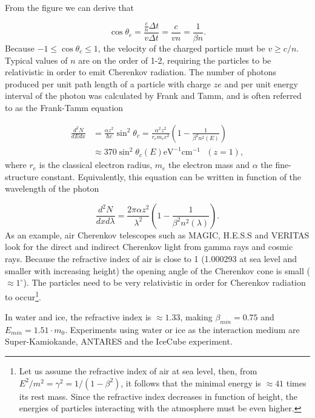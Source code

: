 From the figure we can derive that

\begin{equation}
\cos\theta_c = \frac{\frac{c}{n} \Delta t}{v \Delta t} = \frac{c}{vn} = \frac{1}{\beta n}.
\end{equation} 
Because $-1 \leq \cos\theta_c \leq 1$, the velocity of the charged particle must be $v \geq c/n$. Typical values of $n$ are on the order of 1-2, requiring the particles to be relativistic in order to emit Cherenkov radiation. The number of photons produced per unit path length of a particle with charge $ze$ and per unit energy interval of the photon was calculated by Frank and Tamm, and is often referred to as the Frank-Tamm equation \cite{PDG2018url}

\begin{equation}
\begin{split}
\frac{d^2N}{dE dx} &= \frac{\alpha z^2}{\hbar c} \sin^2 \theta_c = \frac{\alpha^2 z^2}{r_e m_e c^2} \left( 1 - \frac{1}{\beta^2 n^2\left(E\right)} \right)\\
&\approx 370 \sin^2 \theta_c \left(E\right) \textrm{eV}^{-1} \textrm{cm}^{-1} \ \ \ \left( z =1\right),
\end{split}
\end{equation}
where $r_e$ is the classical electron radius, $m_e$ the electron mass and $\alpha$ the fine-structure constant. Equivalently, this equation can be written in function of the wavelength of the photon

\begin{equation}
\label{eq:franktamm}
\frac{d^2N}{dx d\lambda}  = \frac{2\pi \alpha z^2}{\lambda^2} \left(1- \frac{1}{\beta^2 n^2 \left(\lambda \right)} \right).
\end{equation}
As an example, air Cherenkov telescopes such as MAGIC, H.E.S.S and VERITAS look for the direct and indirect Cherenkov light from gamma rays and cosmic rays. Because the refractive index of air is close to 1 (1.000293 at sea level and smaller with increasing height) the opening angle of the Cherenkov cone is small ($\approx 1^{\circ}$). The particles need to be very relativistic in order for Cherenkov radiation to occur\footnote{Let us assume the refractive index of air at sea level, then, from $E^2/m^2 = \gamma^2 = 1/(1-\beta^2)$, it follows that the minimal energy is $\approx 41$ times its rest mass. Since the refractive index decreases in function of height, the energies of particles interacting with the atmosphere must be even higher.}.

In water and ice, the refractive index is $\approx 1.33$, making $\beta_{min} = 0.75$ and $E_{min} = 1.51 \cdot m_0$. Experiments using water or ice as the interaction medium are Super-Kamiokande, ANTARES and the IceCube experiment.
